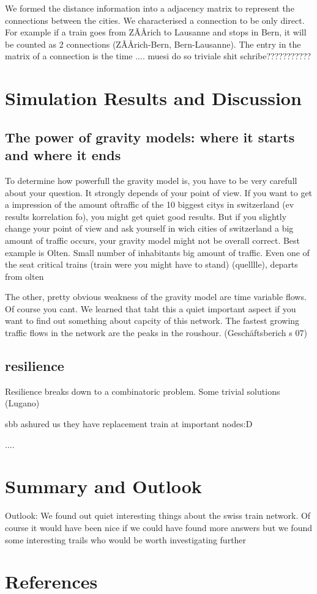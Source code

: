 \documentclass[11pt]{article}
\begin{document}
We formed the distance information into a adjacency matrix to represent the connections between the cities.  We characterised a connection to be only direct. For example if a train goes from ZÃÅrich to Lausanne and stops in Bern, it will be counted as 2 connections (ZÃÅrich-Bern, Bern-Lausanne). The entry in the matrix of a connection is the time .... muesi do so triviale shit schribe???????????




\section{Simulation Results and Discussion}

\subsection{The power of gravity models: where it starts and where it ends}

To determine how powerfull the gravity model is, you have to be very carefull about your question. It strongly depends of your point of view. If you want to get a impression of the amount oftraffic of the 10 biggest citys in switzerland (ev results korrelation fo), you might get quiet good results. But if you slightly change your point of view and ask yourself in wich cities of switzerland a big amount of traffic occurs, your gravity model might not be overall correct. Best example is Olten. Small number of inhabitants big amount of traffic. Even one of the seat critical trains (train were you might have to stand) (quelllle), departs from olten

The other, pretty obvious weakness of the gravity model are time variable flows. Of course you cant. We learned that taht this a quiet important aspect  if you want to find out something about capcity of this network. The fastest growing traffic flows in the network are the peaks in the roushour. (Geschäftsberich s 07)



\subsection{resilience}
 Resilience breaks down to a combinatoric problem. Some trivial solutions (Lugano)
 
 sbb ashured us they have replacement train at important nodes:D

....



\section{Summary and Outlook}

Outlook:
We found out quiet interesting things about the swiss train network. Of course it would have been nice if we could have found more answers but we found some interesting trails who would be worth investigating further

\section{References}
\end{document}
